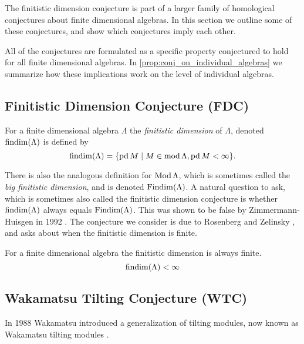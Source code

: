 
The finitistic dimension conjecture is part of a larger family of homological conjectures about finite dimensional algebras. In this section we outline some of these conjectures, and show which conjectures imply each other.

All of the conjectures are formulated as a specific property conjectured to hold for all finite dimensional algebras. In \cref{prop:conj_on_individual_algebras} we summarize how these implications work on the level of individual algebras.

\subsection*{Finitistic Dimension Conjecture (FDC)}
\begin{defn}
	For a finite dimensional algebra $\Lambda$ the \emph{finitistic dimension} of $\Lambda$, denoted $\operatorname{findim}(\Lambda)$ is defined by
	$$\operatorname{findim}(\Lambda) = \{\operatorname{pd} M \mid M \in \operatorname{mod}\Lambda, \operatorname{pd} M < \infty\}.$$
\end{defn}

There is also the analogous definition for $\operatorname{Mod}\Lambda$, which is sometimes called the \emph{big finitistic dimension}, and is denoted $\operatorname{Findim}(\Lambda)$. A natural question to ask, which is sometimes also called the finitistic dimension conjecture is whether $\operatorname{findim}(\Lambda)$ always equals $\operatorname{Findim}(\Lambda)$. This was shown to be false by Zimmermann-Huisgen in 1992 \cite{ZH92}. The conjecture we consider is due to Rosenberg and Zelinsky \cite{Bass60}, and asks about when the finitistic dimension is finite.

\begin{conj}
	For a finite dimensional algebra the finitistic dimension is always finite.
	$$\operatorname{findim}(\Lambda) < \infty$$
\end{conj}

\subsection*{Wakamatsu Tilting Conjecture (WTC)}
In 1988 Wakamatsu introduced a generalization of tilting modules, now known as Wakamatsu tilting modules \cite{Wak88}.

